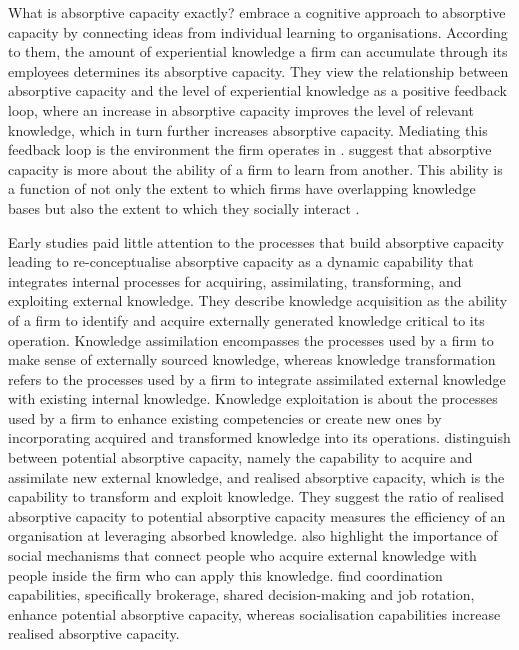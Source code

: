 What is absorptive capacity exactly? \citet{cohen1990absorptive} embrace a cognitive approach to absorptive capacity by connecting ideas from individual learning to organisations. According to them, the amount of experiential knowledge a firm can accumulate through its employees determines its absorptive capacity. They view the relationship between absorptive capacity and the level of experiential knowledge as a positive feedback loop, where an increase in absorptive capacity improves the level of relevant knowledge, which in turn further increases absorptive capacity. Mediating this feedback loop is the environment the firm operates in \citep{van1999coevolution}. \citet{lane1998relative} suggest that absorptive capacity is more about the ability of a firm to learn from another. This ability is a function of not only the extent to which firms have overlapping knowledge bases but also the extent to which they socially interact \citep{dyer1998relational,nooteboom2000learning}. \medskip

Early studies paid little attention to the processes that build absorptive capacity leading \citet{zahra2002absorptive} to re-conceptualise absorptive capacity as a dynamic capability that integrates internal processes for acquiring, assimilating, transforming, and exploiting external knowledge. They describe knowledge acquisition as the ability of a firm to identify and acquire externally generated knowledge critical to its operation. Knowledge assimilation encompasses the processes used by a firm to make sense of externally sourced knowledge, whereas knowledge transformation refers to the processes used by a firm to integrate assimilated external knowledge with existing internal knowledge. Knowledge exploitation is about the processes used by a firm to enhance existing competencies or create new ones by incorporating acquired and transformed knowledge into its operations. \citet{zahra2002absorptive} distinguish between potential absorptive capacity, namely the capability to acquire and assimilate new external knowledge, and realised absorptive capacity, which is the capability to transform and exploit knowledge. They suggest the ratio of realised absorptive capacity to potential absorptive capacity measures the efficiency of an organisation at leveraging absorbed knowledge. \citet{zahra2002absorptive} also highlight the importance of social mechanisms that connect people who acquire external knowledge with people inside the firm who can apply this knowledge. \citet{jansen2005managing} find coordination capabilities, specifically brokerage, shared decision-making and job rotation, enhance potential absorptive capacity, whereas socialisation capabilities increase realised absorptive capacity. \medskip


